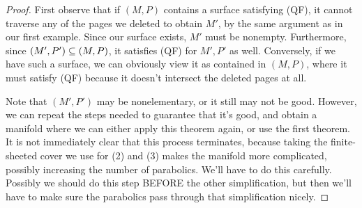 \begin{proof}

First observe that if $(M,P)$ contains a surface satisfying (QF), it cannot
traverse any of the pages we deleted to obtain $M'$, by the same argument as in
our first example.  Since our surface exists, $M'$ must be nonempty.
Furthermore, since $(M',P') \subseteq (M,P)$, it satisfies (QF) for $M',P'$ as well.
Conversely, if we have such a surface, we can obviously view it as contained in
$(M,P)$, where it must satisfy (QF) because it doesn't intersect the deleted
pages at all.

Note that $(M',P')$ may be nonelementary, or it still may not be good.
However, we can repeat the steps needed to guarantee that it's good, and obtain
a manifold where we can either apply this theorem again, or use the first
theorem. It is not immediately clear that this process terminates, because
taking the finite-sheeted cover we use for (2) and (3) makes the manifold more
complicated, possibly increasing the number of parabolics. We'll have to do
this carefully. Possibly we should do this step BEFORE the other
simplification, but then we'll have to make sure the parabolics pass through
that simplification nicely.

\end{proof}
